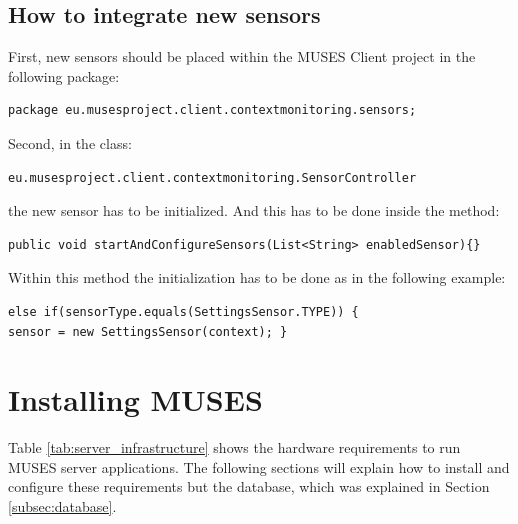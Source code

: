 \documentclass[a4paper,11pt]{book}
\begin{document}
\section{How to integrate new sensors}
\label{sec:integratesensor}

First, new sensors should be placed within the MUSES Client project in the following package:
 
\begin{verbatim}
package eu.musesproject.client.contextmonitoring.sensors;
\end{verbatim}

Second, in the class:

\begin{verbatim}
eu.musesproject.client.contextmonitoring.SensorController
\end{verbatim}

the new sensor has to be initialized. And this has to be done inside the method: 

\begin{verbatim}
public void startAndConfigureSensors(List<String> enabledSensor){}
\end{verbatim}

Within this method the initialization has to be done as in the following example:

\begin{verbatim}
else if(sensorType.equals(SettingsSensor.TYPE)) {
sensor = new SettingsSensor(context); }
\end{verbatim}

\chapter{Installing MUSES}
\label{ch:installmuses}

Table \ref{tab:server_infrastructure} shows the hardware requirements to run MUSES server applications. The following sections will explain how to install and configure these requirements but the database, which was explained in Section \ref{subsec:database}.
\end{document}
